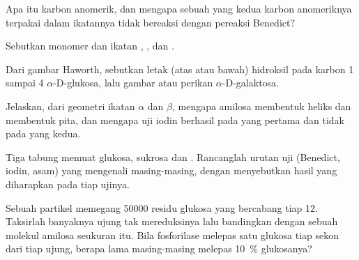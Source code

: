 \begin{exercise}[$\star$]\label{exo:b1:carbohydrates:2}
Apa itu karbon anomerik, dan mengapa sebuah  yang kedua karbon
anomeriknya terpakai dalam ikatannya tidak bereaksi dengan pereaksi
Benedict?
\end{exercise}

\begin{exercise}[$\star$]\label{exo:b1:carbohydrates:3}
Sebutkan monomer dan ikatan , ,  dan .
\end{exercise}

\begin{exercise}[$\star$]\label{exo:b1:carbohydrates:4}
Dari gambar Haworth, sebutkan letak (atas atau bawah) hidroksil pada
karbon 1 sampai 4 $\alpha$-D-glukosa, lalu gambar atau perikan
$\alpha$-D-galaktosa.
\end{exercise}

\begin{exercise}[$\star\star$]\label{exo:b1:carbohydrates:5}
Jelaskan, dari geometri ikatan $\alpha$ dan $\beta$, mengapa amilosa
membentuk heliks dan  membentuk pita, dan mengapa uji iodin
berhasil pada yang pertama dan tidak pada yang kedua.
\end{exercise}

\begin{exercise}[$\star\star$]\label{exo:b1:carbohydrates:6}
Tiga tabung memuat glukosa, sukrosa dan . Rancanglah urutan uji
(Benedict, iodin,  asam) yang mengenali masing-masing, dengan
menyebutkan hasil yang diharapkan pada tiap ujinya.
\end{exercise}

\begin{exercise}[$\star\star$]\label{exo:b1:carbohydrates:7}
Sebuah partikel  memegang \num{50000} residu glukosa yang
bercabang tiap 12. Taksirlah banyaknya ujung tak mereduksinya lalu
bandingkan dengan sebuah molekul amilosa seukuran itu. Bila fosforilase
melepas satu glukosa tiap sekon dari tiap ujung, berapa lama
masing-masing melepas \qty{10}{\%} glukosanya?
\end{exercise}

